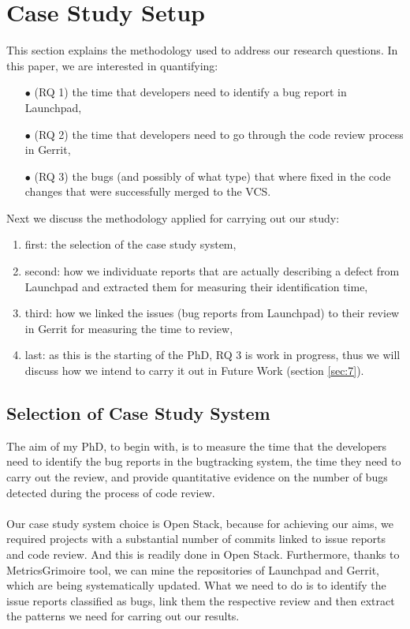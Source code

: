 \documentclass[ifip]{svmult}
\begin{document}
\section{Case Study Setup}
\label{sec:4}

This section explains the methodology used to address our research questions.  
In this paper, we are interested in quantifying:
\begin{itemize}
 \item[$\bullet$] (RQ 1) the time that developers need to identify a bug report in Launchpad,
 \item[$\bullet$] (RQ 2) the time that developers need to go through the code review process in Gerrit,
 \item[$\bullet$] (RQ 3) the bugs (and possibly of what type) that where fixed in the
code changes that were successfully merged to the VCS.
\end{itemize}

Next we discuss the methodology applied for carrying out our study:
\begin{enumerate}
 \item first: the selection of the case study system,
 \item second: how we individuate reports that are actually describing a defect from Launchpad and extracted them for measuring 
 their identification time,
 \item third: how we linked the issues (bug reports from Launchpad) to their review in Gerrit for measuring the time to review,
 \item last: as this is the starting of the PhD, RQ 3 is work in progress, thus we will discuss how we intend to 
 carry it out in Future Work (section \ref{sec:7}).
\end{enumerate}


\subsection{Selection of Case Study System}
The aim of my PhD, to begin with, is to measure the time that the developers need to identify 
the bug reports in the bugtracking system, 
the time they need to carry out the review, and provide quantitative evidence on the number of bugs detected during the process 
of code review. 
\\
\\
Our case study system choice is Open Stack, because for achieving our aims, we required projects with a
substantial number of commits linked to issue reports and code review. And this is 
readily done in Open Stack.
Furthermore, thanks to MetricsGrimoire tool, we can mine the repositories of Launchpad and Gerrit, which are 
being systematically updated.
What we need to do is to identify the issue reports classified as bugs, link them the respective review and then 
extract the patterns we need for carring out our results.
\end{document}
